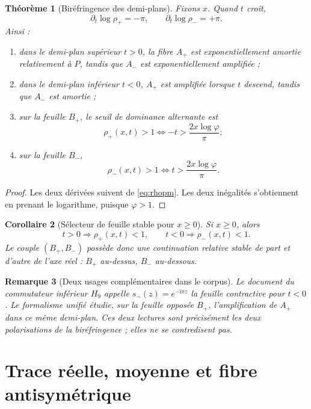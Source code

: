 \documentclass[11pt,a4paper]{article}
\newtheorem{theorem}{Théorème}[section]
\newtheorem{corollary}[theorem]{Corollaire}
\newtheorem{remark}[theorem]{Remarque}
\newcommand{\ii}{\mathrm i}
\newcommand{\ph}{\varphi}
\begin{document}
\begin{theorem}[Biréfringence des demi-plans]\label{thm:halfplanes}
Fixons $x$. Quand $t$ croît,
\[
 \partial_t\log\rho_+=-\pi,\qquad
 \partial_t\log\rho_-=+\pi.
\]
Ainsi :
\begin{enumerate}[label=\textup{(\roman*)}]
\item dans le demi-plan supérieur $t>0$, la fibre $A_+$ est exponentiellement amortie relativement à $P$, tandis que $A_-$ est exponentiellement amplifiée ;
\item dans le demi-plan inférieur $t<0$, $A_+$ est amplifiée lorsque $t$ descend, tandis que $A_-$ est amortie ;
\item sur la feuille $B_+$, le seuil de dominance alternante est
\begin{equation}\label{eq:thresholdplus}
 \rho_+(x,t)>1
 \iff
 -t>\frac{2x\log\ph}{\pi};
\end{equation}
\item sur la feuille $B_-$,
\[
 \rho_-(x,t)>1
 \iff
 t>\frac{2x\log\ph}{\pi}.
\]
\end{enumerate}
\end{theorem}

\begin{proof}
Les deux dérivées suivent de \eqref{eq:rhopm}. Les deux inégalités s'obtiennent en prenant le logarithme, puisque $\ph>1$.
\end{proof}

\begin{corollary}[Sélecteur de feuille stable pour $x\ge0$]
Si $x\ge0$, alors
\[
 t>0\Longrightarrow \rho_+(x,t)<1,
 \qquad
 t<0\Longrightarrow \rho_-(x,t)<1.
\]
Le couple $(B_+,B_-)$ possède donc une continuation relative stable de part et d'autre de l'axe réel : $B_+$ au-dessus, $B_-$ au-dessous.
\end{corollary}

\begin{remark}[Deux usages complémentaires dans le corpus]
Le document du commutateur inférieur $H_9$ appelle $s_-(z)=e^{-\ii\pi z}$ la feuille contractive pour $t<0$. Le formalisme unifié étudie, sur la feuille opposée $B_+$, l'amplification de $A_+$ dans ce même demi-plan. Ces deux lectures sont précisément les deux polarisations de la biréfringence ; elles ne se contredisent pas.
\end{remark}

\section{Trace réelle, moyenne et fibre antisymétrique}
\end{document}
